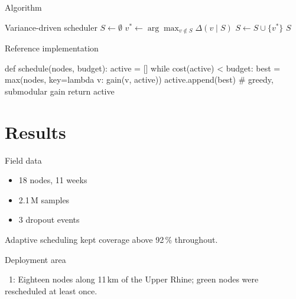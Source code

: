 \documentclass[aspectratio=169,10pt]{beamer}
\begin{document}
\begin{frame}{Algorithm}
  \begin{pseudocode}{Variance-driven scheduler}
    \State $S \gets \emptyset$
      \State $v^\ast \gets \arg\max_{v \notin S} \Delta(v \mid S)$
      \State $S \gets S \cup \{v^\ast\}$
    \EndWhile
    \State \Return $S$
  \end{pseudocode}
\end{frame}

\begin{frame}[fragile]{Reference implementation}
  \begin{code}[language=Python]
def schedule(nodes, budget):
    active = []
    while cost(active) < budget:
        best = max(nodes, key=lambda v: gain(v, active))
        active.append(best)   # greedy, submodular gain
    return active
  \end{code}
\end{frame}

\section{Results}

\begin{frame}{Field data}
  \begin{twocols}
    \colbreak
    \begin{itemize}
      \item 18 nodes, 11 weeks
      \item 2.1\,M samples
      \item 3 dropout events
    \end{itemize}
    \vspace{0.6em}
    Adaptive scheduling kept coverage above 92\,\% throughout.
  \end{twocols}
\end{frame}

\begin{frame}{Deployment area}
  \vspace{0.6em}
  {\centering\small\color{thbmuted}
    ~1: Eighteen nodes along 11\,km of the Upper Rhine; green nodes
    were rescheduled at least once.\par}
\end{frame}
\end{document}
